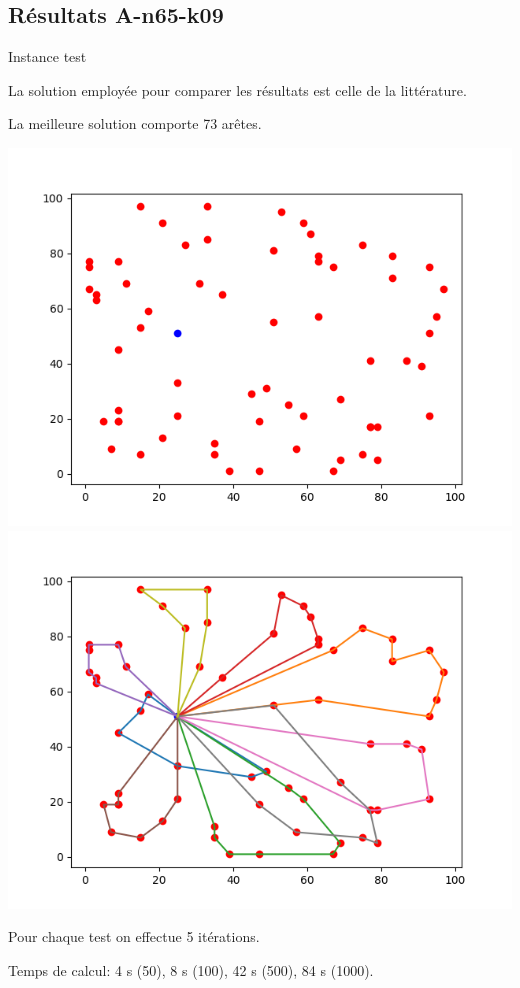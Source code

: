 \documentclass{beamer}
\begin{document}
\subsection{Résultats A-n65-k09}

\begin{frame}{Instance test}

La solution employée pour comparer les résultats est celle de la littérature.

La meilleure solution comporte 73 arêtes.

\includegraphics[scale=0.3]{Instance6509.png}
\includegraphics[scale=0.3]{Solution6509.png}

Pour chaque test on effectue 5 itérations.

Temps de calcul: 4 s (50), 8 s (100), 42 s (500), 84 s (1000).
\end{frame}
\end{document}
